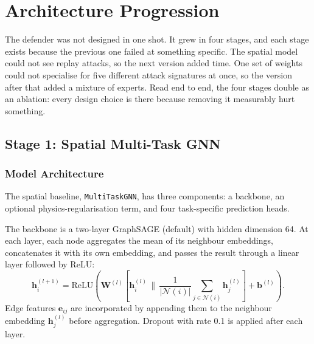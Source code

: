 \chapter{Architecture Progression}
\label{ch:architecture}

The defender was not designed in one shot. It grew in four stages,
and each stage exists because the previous one failed at something
specific. The spatial model could not see replay attacks, so the
next version added time. One set of weights could not specialise
for five different attack signatures at once, so the version after
that added a mixture of experts. Read end to end, the four stages
double as an ablation: every design choice is there because
removing it measurably hurt something.

\section{Stage 1: Spatial Multi-Task GNN}
\label{sec:spatial_gnn}

\subsection{Model Architecture}

The spatial baseline, \texttt{MultiTaskGNN}, has three components:
a \gnn{} backbone, an optional physics-regularisation term, and four
task-specific prediction heads.

The backbone is a two-layer GraphSAGE (default) with hidden
dimension 64. At each layer, each node aggregates the mean of its
neighbour embeddings, concatenates it with its own embedding, and
passes the result through a linear layer followed by ReLU:
\begin{equation}
  \mathbf{h}_i^{(l+1)} = \mathrm{ReLU}\!\left(
    \mathbf{W}^{(l)}\!\left[
      \mathbf{h}_i^{(l)} \,\big\|\,
      \frac{1}{|\mathcal{N}(i)|}
      \sum_{j \in \mathcal{N}(i)} \mathbf{h}_j^{(l)}
    \right] + \mathbf{b}^{(l)}
  \right).
\end{equation}
Edge features $\mathbf{e}_{ij}$ are incorporated by appending them
to the neighbour embedding $\mathbf{h}_j^{(l)}$ before aggregation.
Dropout with rate 0.1 is applied after each layer.

